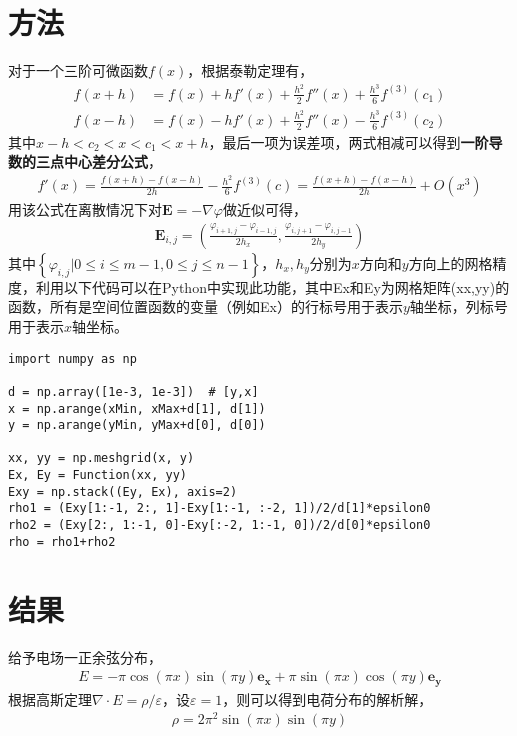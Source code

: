 \documentclass{article} %
\renewcommand{\vec}[1]{\boldsymbol{#1}} %
\begin{document}
\section{方法}
对于一个三阶可微函数$f(x)$，根据泰勒定理有，
\begin{align}
    f(x+h) & =f(x)+hf'(x)+\frac{h^2}{2}f''(x)+\frac{h^3}{6}f^{(3)}(c_1) \\
    f(x-h) & =f(x)-hf'(x)+\frac{h^2}{2}f''(x)-\frac{h^3}{6}f^{(3)}(c_2)
\end{align}
其中$x-h<c_2<x<c_1<x+h$，最后一项为误差项，两式相减可以得到\textbf{一阶导数的三点中心差分公式}，
\begin{align}
    f'(x)=\frac{f(x+h)-f(x-h)}{2h}-\frac{h^2}{6}f^{(3)}(c)=\frac{f(x+h)-f(x-h)}{2h}+O(x^3)
\end{align}
用该公式在离散情况下对$\vec{E}=-\nabla \varphi$做近似可得，
\begin{align}
    \vec{E}_{i,j}=\left(\frac{\varphi_{i+1,j}-\varphi_{i-1,j}}{2h_x},\frac{\varphi_{i,j+1}-\varphi_{i,j-1}}{2h_y}\right)
\end{align}
其中$\left\{\varphi_{i,j}|0\leq i\leq m-1,0\leq j\leq n-1\right\}$，$h_x,h_y$分别为$x$方向和$y$方向上的网格精度，利用以下代码可以在Python中实现此功能，其中Ex和Ey为网格矩阵(xx,yy)的函数，所有是空间位置函数的变量（例如Ex）的行标号用于表示$y$轴坐标，列标号用于表示$x$轴坐标。
\begin{lstlisting}
import numpy as np

d = np.array([1e-3, 1e-3])  # [y,x]
x = np.arange(xMin, xMax+d[1], d[1])
y = np.arange(yMin, yMax+d[0], d[0])

xx, yy = np.meshgrid(x, y)
Ex, Ey = Function(xx, yy)
Exy = np.stack((Ey, Ex), axis=2)
rho1 = (Exy[1:-1, 2:, 1]-Exy[1:-1, :-2, 1])/2/d[1]*epsilon0
rho2 = (Exy[2:, 1:-1, 0]-Exy[:-2, 1:-1, 0])/2/d[0]*epsilon0
rho = rho1+rho2
\end{lstlisting}

\section{结果}
给予电场一正余弦分布，
\begin{align}
    E=-\pi\cos(\pi x)\sin(\pi y)\vec{e_x}+\pi\sin(\pi x)\cos(\pi y)\vec{e_y}
\end{align}
根据高斯定理$\nabla \cdot E = \rho / \varepsilon$，设$\varepsilon=1$，则可以得到电荷分布的解析解，
\begin{align}
    \rho=2\pi^2 \sin(\pi x)\sin(\pi y)
\end{align}
\end{document}
